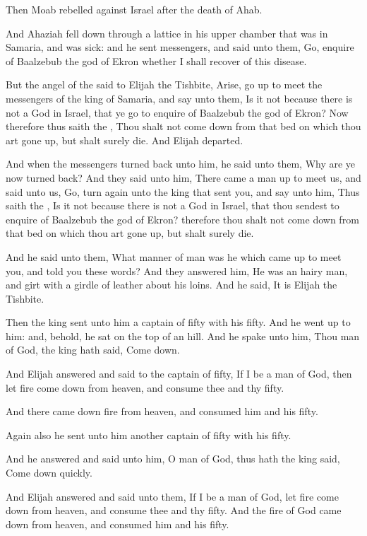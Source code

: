 \Chapter
\Verse Then Moab rebelled against Israel after the death of Ahab.

\Verse And Ahaziah fell down through a lattice in his upper chamber that was in Samaria, and was sick: and he sent messengers, and said unto them, Go, enquire of Baalzebub the god of Ekron whether I shall recover of this disease.

\Verse But the angel of the \LORD said to Elijah the Tishbite, Arise, go up to meet the messengers of the king of Samaria, and say unto them, Is it not because there is not a God in Israel, that ye go to enquire of Baalzebub the god of Ekron?  \Verse Now therefore thus saith the \LORD, Thou shalt not come down from that bed on which thou art gone up, but shalt surely die. And Elijah departed.

\Verse And when the messengers turned back unto him, he said unto them, Why are ye now turned back?  \Verse And they said unto him, There came a man up to meet us, and said unto us, Go, turn again unto the king that sent you, and say unto him, Thus saith the \LORD, Is it not because there is not a God in Israel, that thou sendest to enquire of Baalzebub the god of Ekron? therefore thou shalt not come down from that bed on which thou art gone up, but shalt surely die.

\Verse And he said unto them, What manner of man was he which came up to meet you, and told you these words?  \Verse And they answered him, He was an hairy man, and girt with a girdle of leather about his loins. And he said, It is Elijah the Tishbite.

\Verse Then the king sent unto him a captain of fifty with his fifty. And he went up to him: and, behold, he sat on the top of an hill. And he spake unto him, Thou man of God, the king hath said, Come down.

\Verse And Elijah answered and said to the captain of fifty, If I be a man of God, then let fire come down from heaven, and consume thee and thy fifty.

And there came down fire from heaven, and consumed him and his fifty.

\Verse Again also he sent unto him another captain of fifty with his fifty.

And he answered and said unto him, O man of God, thus hath the king said, Come down quickly.

\Verse And Elijah answered and said unto them, If I be a man of God, let fire come down from heaven, and consume thee and thy fifty. And the fire of God came down from heaven, and consumed him and his fifty.

